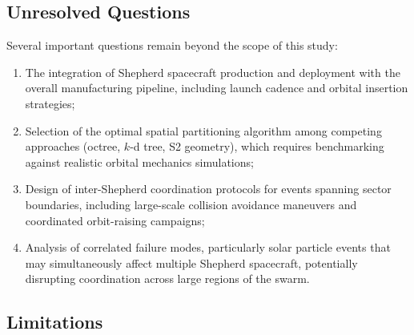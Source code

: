 \documentclass[journal]{IEEEtran}
\begin{document}
\subsection{Unresolved Questions}

Several important questions remain beyond the scope of this study:

\begin{enumerate}
    \item The integration of Shepherd spacecraft production and deployment with the overall manufacturing pipeline, including launch cadence and orbital insertion strategies;
    \item Selection of the optimal spatial partitioning algorithm among competing approaches (octree, $k$-d tree, S2 geometry), which requires benchmarking against realistic orbital mechanics simulations;
    \item Design of inter-Shepherd coordination protocols for events spanning sector boundaries, including large-scale collision avoidance maneuvers and coordinated orbit-raising campaigns;
    \item Analysis of correlated failure modes, particularly solar particle events that may simultaneously affect multiple Shepherd spacecraft, potentially disrupting coordination across large regions of the swarm.
\end{enumerate}

\subsection{Limitations}
\end{document}
